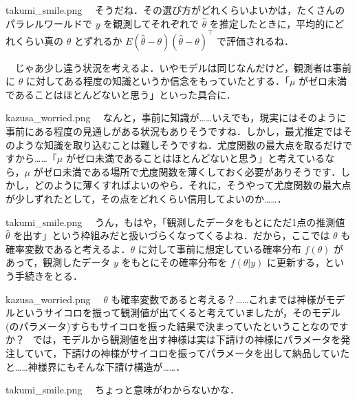 \documentclass[b5paper,xelatex,ja=standard,10pt]{bxjsarticle}
\begin{document}
\begin{SERIFU}[colback=PaleGold,colbacktitle=PaleGold2]{takumi_smile.png}
　そうだね．その選び方がどれくらいよいかは，たくさんのパラレルワールドで $y$ を観測してそれぞれで $\hat{\theta}$ を推定したときに，平均的にどれくらい真の $\theta$ とずれるか $E(\hat{\theta} - \theta)(\hat{\theta} - \theta)^\top$ で評価されるね．

　じゃあ少し違う状況を考えるよ．いやモデルは同じなんだけど，観測者は事前に $\theta$ に対してある程度の知識というか信念をもっていたとする．「$\mu$ がゼロ未満であることはほとんどないと思う」といった具合に．
\end{SERIFU}


\begin{SERIFU}[colback=PaleIris,colbacktitle=PaleIris2]{kazusa_worried.png}
　なんと，事前に知識が……いえでも，現実にはそのように事前にある程度の見通しがある状況もありそうですね．しかし，最尤推定ではそのような知識を取り込むことは難しそうですね．尤度関数の最大点を取るだけですから……「$\mu$ がゼロ未満であることはほとんどないと思う」と考えているなら，$\mu$ がゼロ未満である場所で尤度関数を薄くしておく必要がありそうです．しかし，どのように薄くすればよいのやら．それに，そうやって尤度関数の最大点が少しずれたとして，その点をどれくらい信用してよいのか……．
\end{SERIFU}


\begin{SERIFU}[colback=PaleGold,colbacktitle=PaleGold2]{takumi_smile.png}
　うん，もはや，「観測したデータをもとにただ1点の推測値 $\hat{\theta}$ を出す」という枠組みだと扱いづらくなってくるよね．だから，ここでは $\theta$ も確率変数であると考えるよ．$\theta$ に対して事前に想定している確率分布 $f(\theta)$ があって，観測したデータ $y$ をもとにその確率分布を $f(\theta|y)$ に更新する，という手続きをとる．
\end{SERIFU}


\begin{SERIFU}[colback=PaleIris,colbacktitle=PaleIris2]{kazusa_worried.png}
　$\theta$ も確率変数であると考える？……これまでは神様がモデルというサイコロを振って観測値が出てくると考えていましたが，そのモデル(のパラメータ)すらもサイコロを振った結果で決まっていたということなのですか？ \, では，モデルから観測値を出す神様は実は下請けの神様にパラメータを発注していて，下請けの神様がサイコロを振ってパラメータを出して納品していたと……神様界にもそんな下請け構造が……．
\end{SERIFU}


\begin{SERIFU}[colback=PaleGold,colbacktitle=PaleGold2]{takumi_smile.png}
　ちょっと意味がわからないかな．
\end{SERIFU}
\end{document}
